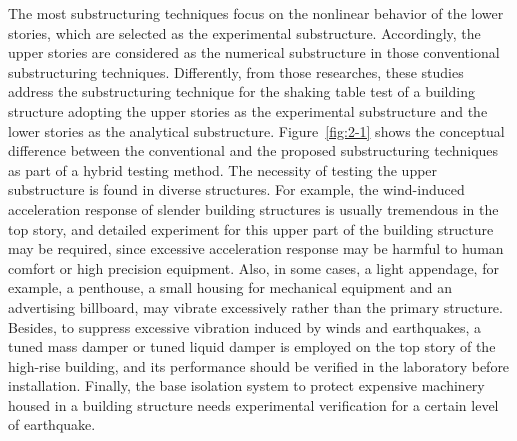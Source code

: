 The most substructuring techniques focus on the nonlinear behavior of the lower stories, which are selected as the experimental substructure. Accordingly, the upper stories are considered as the numerical substructure in those conventional substructuring techniques. Differently, from those researches, these studies address the substructuring technique for the shaking table test of a building structure adopting the upper stories as the experimental substructure and the lower stories as the analytical substructure. Figure~\ref{fig:2-1} shows the conceptual difference between the conventional and the proposed substructuring techniques as part of a hybrid testing method. 
The necessity of testing the upper substructure is found in diverse structures. For example, the wind-induced acceleration response of slender building structures is usually tremendous in the top story, and detailed experiment for this upper part of the building structure may be required, since excessive acceleration response may be harmful to human comfort or high precision equipment. Also, in some cases, a light appendage, for example, a penthouse, a small housing for mechanical equipment and an advertising billboard, may vibrate excessively rather than the primary structure. Besides, to suppress excessive vibration induced by winds and earthquakes, a tuned mass damper or tuned liquid damper is employed on the top story of the high-rise building, and its performance should be verified in the laboratory before installation. Finally, the base isolation system to protect expensive machinery housed in a building structure needs experimental verification for a certain level of earthquake.

